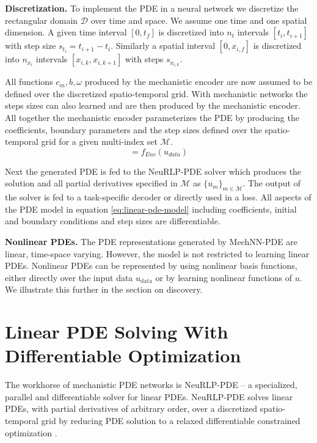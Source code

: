 \textbf{Discretization.}
To implement the PDE in a neural network we discretize the rectangular domain $\mathcal{D}$ over time and space.
We assume one time and one spatial dimension.
A given time interval $[0,t_f]$ is discretized into $n_t$ intervals $[t_i, t_{i+1}]$ with step size $s_{t_i} = t_{i+1}-t_i$.
Similarly a spatial interval $[0,x_{i,f}]$ is discretized into $n_{x_i}$ intervals $[x_{i,k}, x_{i,k+1}]$ with steps $s_{x_{i,k}}$.

All functions $c_m,b, \omega$ produced by the mechanistic encoder are now assumed to be defined over the discretized spatio-temporal grid.
With mechanistic networks the steps sizes can also learned and are then produced by the mechanistic encoder. 
All together the mechanistic encoder parameterizes the PDE by producing the coefficients, boundary parameters and the step sizes defined over the spatio-temporal grid for a given multi-index set $\mathcal{M}$.
\begin{equation}
[\{c_m\}_{m\in\mathcal{M}}, b, \omega, \{s_{t_i}\}, \{s_{x_i}\}] = f_{Enc}(u_{data})
\end{equation}

Next the generated PDE is fed to the NeuRLP-PDE solver which produces the solution and all partial derivatives specified in $\mathcal{M}$ as $\{u_m\}_{m\in\mathcal{M}}$.
The output of the solver is fed to a task-specific decoder or directly used in a loss.
All aspects of the PDE model in equation \ref{eq:linear-pde-model} including coefficients, initial and boundary conditions and step sizes are differentiable.

\textbf{Nonlinear PDEs.} The PDE representations generated by MechNN-PDE are linear, time-space varying.
However, the model is not restricted to learning linear PDEs. 
Nonlinear PDEs can be represented by using nonlinear basis functions, either directly over the input data $u_\text{data}$ or by learning nonlinear functions of $u$.
We illustrate this further in the section on discovery.
\endgroup


\section{Linear PDE Solving With Differentiable Optimization}
The workhorse of mechanistic PDE networks is NeuRLP-PDE -- a specialized, parallel and differentiable solver for linear PDEs.
NeuRLP-PDE solves linear PDEs, with partial derivatives of arbitrary order, over a discretized spatio-temporal grid by reducing PDE solution to a relaxed differentiable constrained optimization \cite{young1961linear}. 

